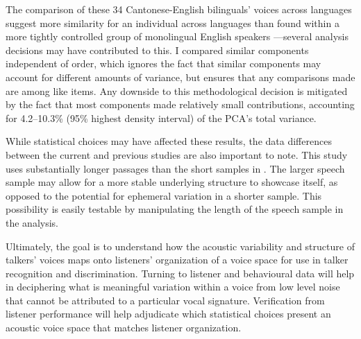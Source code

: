 The comparison of these 34 Cantonese-English bilinguals' voices across languages suggest more similarity for an individual across languages than found within a more tightly controlled group of monolingual English speakers \citep{lee_2019_acoustic}---several analysis decisions may have contributed to this. I compared similar components independent of order, which ignores the fact that similar components may account for different amounts of variance, but ensures that any comparisons made are among like items. Any downside to this methodological decision is mitigated by the fact that most components made relatively small contributions, accounting for 4.2--10.3\% (95\% highest density interval) of the PCA's total variance. 

While statistical choices may have affected these results, the data differences between the current and previous studies are also important to note. This study uses substantially longer passages than the short samples in \citet{lee_2019_acoustic}. The larger speech sample may allow for a more stable underlying structure to showcase itself, as opposed to the potential for ephemeral variation in a shorter sample. This possibility is easily testable by manipulating the length of the speech sample in the analysis.

Ultimately, the goal is to understand how the acoustic variability and structure of talkers' voices maps onto listeners' organization of a voice space for use in talker recognition and discrimination. Turning to listener and behavioural data will help in deciphering what is meaningful variation within a voice from low level noise that cannot be attributed to a particular vocal signature. Verification from listener performance will help adjudicate which statistical choices present an acoustic voice space that matches listener organization. 

\endinput %
